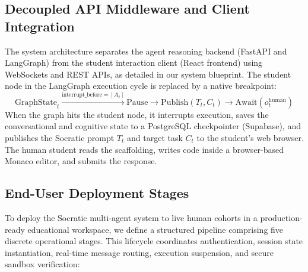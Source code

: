 \documentclass[11pt,a4paper]{report}
\begin{document}
\subsection{Decoupled API Middleware and Client Integration}
The system architecture separates the agent reasoning backend (FastAPI and LangGraph) from the student interaction client (React frontend) using WebSockets and REST APIs, as detailed in our system blueprint. The student node in the LangGraph execution cycle is replaced by a native breakpoint:
\begin{equation}
    \text{GraphState}_t \xrightarrow{\text{interrupt\_before} = [A_s]} \text{Pause} \to \text{Publish}(T_t, C_t) \to \text{Await}(o_t^{\text{human}})
\end{equation}
When the graph hits the student node, it interrupts execution, saves the conversational and cognitive state to a PostgreSQL checkpointer (Supabase), and publishes the Socratic prompt $T_t$ and target task $C_t$ to the student's web browser. The human student reads the scaffolding, writes code inside a browser-based Monaco editor, and submits the response.

\subsection{End-User Deployment Stages}
To deploy the Socratic multi-agent system to live human cohorts in a production-ready educational workspace, we define a structured pipeline comprising five discrete operational stages. This lifecycle coordinates authentication, session state instantiation, real-time message routing, execution suspension, and secure sandbox verification:
\end{document}
